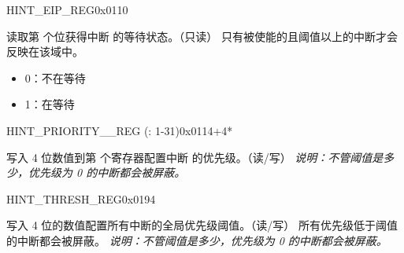 \begin{register}{H}{INT\_EIP\_REG}{0x0110}\label{regdesc:INTEIPREG}
%
%
\regnewline%
\begin{regdesc}
\begin{reglist}
\item [INT\_EIP\lbrack\regindex{n}\rbrack] 读取第  个位获得中断   的等待状态。（只读） \newline 只有被使能的且阈值以上的中断才会反映在该域中。
\begin{itemize}
    \setlength\itemsep{-1em}
    \item 0：不在等待
    \item 1：在等待
\end{itemize}
\end{reglist}
\end{regdesc}
\end{register}

\begin{register}{H}{INT\_PRIORITY\_\_REG (: 1-31)}{0x0114+4*}\label{regdesc:INTPRIORITYREG}
%
%
\regnewline%
\begin{regdesc}
\begin{reglist}
\label{fielddesc:INTPRIORITY}\item [INT\_PRIORITY\_\regindex{n}] 写入 4 位数值到第  个寄存器配置中断  的优先级。（读/写） \newline \textit{说明：不管阈值是多少，优先级为 0 的中断都会被屏蔽。}
\end{reglist}
\end{regdesc}
\end{register}

\begin{register}{H}{INT\_THRESH\_REG}{0x0194}\label{regdesc:INTTHRESHREG}
%
%
\regnewline%
\begin{regdesc}
\begin{reglist}
\label{fielddesc:INTTHRESH}\item [INT\_THRESH] 写入 4 位的数值配置所有中断的全局优先级阈值。（读/写） \newline 所有优先级低于阈值的中断都会被屏蔽。 \newline \textit{说明：不管阈值是多少，优先级为 0 的中断都会被屏蔽。}
\end{reglist}
\end{regdesc}
\end{register}
